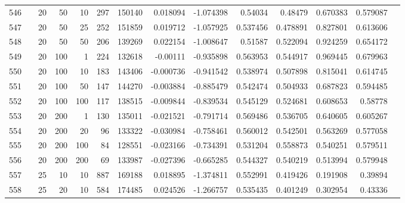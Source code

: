 \begin{longtable}{llrrrrrrrrrrrr}
		546 & &           20 &                50 &           10 &         297 &     150140 &  0.018094 & -1.074398 &   0.54034 &     0.48479 &       0.670383 &  0.579087 \\
		547 & &           20 &                50 &           25 &         252 &     151859 &  0.019712 & -1.057925 &  0.537456 &    0.478891 &       0.827801 &  0.613606 \\
		548 & &           20 &                50 &           50 &         206 &     139269 &  0.022154 & -1.008647 &   0.51587 &    0.522094 &       0.924259 &  0.654172 \\
		549 & &           20 &               100 &            1 &         224 &     132618 &  -0.00111 & -0.935898 &  0.563953 &    0.544917 &       0.969445 &  0.679963 \\
		550 & &           20 &               100 &           10 &         183 &     143406 & -0.000736 & -0.941542 &  0.538974 &    0.507898 &       0.815041 &  0.614745 \\
		551 & &           20 &               100 &           50 &         147 &     144270 & -0.003884 & -0.885479 &  0.542474 &    0.504933 &       0.687823 &  0.594485 \\
		552 & &           20 &               100 &          100 &         117 &     138515 & -0.009844 & -0.839534 &  0.545129 &    0.524681 &       0.608653 &   0.58778 \\
		553 & &           20 &               200 &            1 &         130 &     135011 & -0.021521 & -0.791714 &  0.569486 &    0.536705 &       0.640605 &  0.605267 \\
		554 & &           20 &               200 &           20 &          96 &     133322 & -0.030984 & -0.758461 &  0.560012 &    0.542501 &       0.563269 &  0.577058 \\
		555 & &           20 &               200 &          100 &          84 &     128551 & -0.023166 & -0.734391 &  0.531204 &    0.558873 &       0.540251 &  0.579511 \\
		556 & &           20 &               200 &          200 &          69 &     133987 & -0.027396 & -0.665285 &  0.544327 &    0.540219 &       0.513994 &  0.579948 \\
		557 & &           25 &                10 &           10 &         887 &     169188 &  0.018895 & -1.374811 &  0.552991 &    0.419426 &       0.191908 &   0.39894 \\
		558 & &           25 &                20 &           10 &         584 &     174485 &  0.024526 & -1.266757 &  0.535435 &    0.401249 &       0.302954 &   0.43336 \\

\end{longtable}
